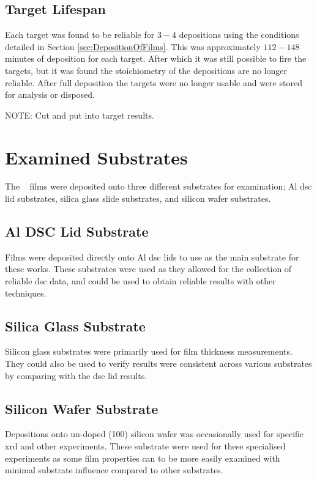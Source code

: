\documentclass[a4paper,12pt,oneside]{report}%
\begin{document}
\subsection{Target Lifespan}
Each target was found to be reliable for $3-4$ depositions using the conditions detailed in Section \ref{sec:DepositionOfFilms}. This was approximately $112-148$ minutes of deposition for each target. After which it was still possible to fire the targets, but it was found the stoichiometry of the depositions are no longer reliable. After full deposition the targets were no longer usable and were stored for analysis or disposed. 

NOTE: Cut and put into target results. 

\section{Examined Substrates} 
The \MgZnCa~ films were deposited onto three different substrates for examination; Al \acrshort{dsc} lid substrates, silica glass slide substrates, and silicon wafer substrates.

\subsection{Al DSC Lid Substrate}
Films were deposited directly onto Al \gls{dsc} lids to use as the main substrate for these works. These substrates were used as they allowed for the collection of reliable \gls{dsc} data, and could be used to obtain reliable results with other techniques. 

\subsection{Silica Glass Substrate}
Silicon glass substrates were primarily used for film thickness measurements. They could also be used to verify results were consistent across various substrates by comparing with the \gls{dsc} lid results. 

\subsection{Silicon Wafer Substrate}
Depositions onto un-doped (100) silicon wafer was occasionally used for specific \gls{xrd} and other experiments. These substrate were used for these specialised experiments as some film properties can to be more easily examined with minimal substrate influence compared to other substrates.
\end{document}
